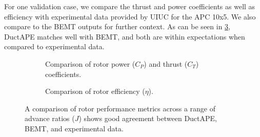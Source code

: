 For one validation case, we compare the thrust and power coefficients as well as efficiency with experimental data provided by UIUC for the APC 10x5.
%
We also compare to the BEMT outputs for further context.
%
As can be seen in \cref{fig:rotval1}, DuctAPE matches well with BEMT, and both are within expectations when compared to experimental data.

\begin{figure}[htb]
     \centering
     \begin{subfigure}[t]{0.45\textwidth}
        \centering
        
        \caption{Comparison of rotor power (\(C_P\)) and thrust (\(C_T\)) coefficients.}
        \label{}
     \end{subfigure}
     \hfill
     \begin{subfigure}[t]{0.45\textwidth}
         \centering
        
        \caption{Comparison of rotor efficiency (\(\eta\)).}
        \label{}
     \end{subfigure}
     \caption{A comparison of rotor performance metrics across a range of advance ratios (\(J\)) shows good agreement between DuctAPE, BEMT, and experimental data.}
    \label{fig:rotval1}
\end{figure}

